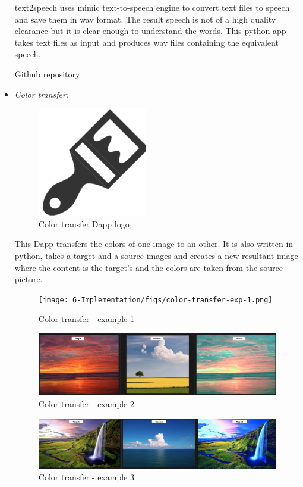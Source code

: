 \begin{itemize}
        text2speech uses mimic text-to-speech engine to convert text files to speech and save them
        in wav format. The result speech is not of a high quality clearance but it is clear enough
        to understand the words. This python app takes text files as input and produces wav files
        containing the equivalent speech.

        Github repository\cite{text-to-speech}

        \item \textit{Color transfer: }

        \begin{figure}[!h]\centering
            \includegraphics[width=.2\columnwidth]{6-Implementation/figs/color-transfer-logo.png}
            \caption{Color transfer Dapp logo}
        \end{figure}

        This Dapp transfers the colors of one image to an other. It is also written in python,
        takes a target and a source images and creates a new resultant image where the content is
        the target's and the colors are taken from the source picture.

        \clearpage

        \begin{figure}[!h]\centering
            \texttt{[image: 6-Implementation/figs/color-transfer-exp-1.png]}
            \caption{Color transfer - example 1}
        \end{figure}

        \begin{figure}[!h]\centering
            \includegraphics[width=\columnwidth]{6-Implementation/figs/color-transfer-exp-2.png}
            \caption{Color transfer - example 2}
        \end{figure}

        \begin{figure}[!h]\centering
            \includegraphics[width=\columnwidth]{6-Implementation/figs/color-transfer-exp-3.png}
            \caption{Color transfer - example 3}
        \end{figure}



\end{itemize}
